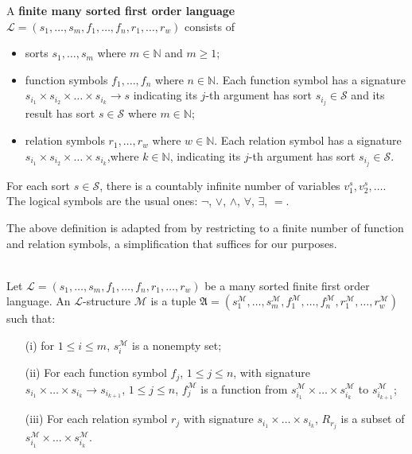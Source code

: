 \begin{definition}
    A \textbf{finite many sorted first order language} 
    \( \mathcal{L} = (s_1,\dots,s_m,f_1,\dots, f_n, r_1, \dots, r_w ) \)
    consists of
    \begin{itemize}
        \item sorts $s_1,\dots,s_m$ where $m \in \mathbb{N}$ and $m \geq 1$;
        \item function symbols $f_1,\dots, f_n$ where $n\in \mathbb{N}$. Each function symbol has a signature $s_{i_1} \times s_{i_2} \times \dots \times s_{i_k} \to s$ indicating its $j$-th argument has sort $s_{i_j} \in \mathcal{S}$ and its result has sort $s \in \mathcal{S}$ where $m \in \mathbb{N}$;
        \item relation symbols $r_1,\dots, r_w$ where $ w\in \mathbb{N}$. Each  relation symbol has a signature $s_{i_1} \times s_{i_2} \times \dots \times s_{i_k}$,where $k \in \mathbb{N}$, indicating its $j$-th argument has sort $s_{i_j} \in \mathcal{S}$.
    \end{itemize}  
    For each sort $s \in \mathcal{S}$, there is a countably infinite number of variables $v_1^s, v_2^s, \dots$. The logical symbols are the usual ones: $\neg$, $\vee$, $\wedge$, $\forall$, $\exists$, $=$.
\end{definition}
The above definition is adapted from \cite[Def.~29.26]{monk2012mathematical} by restricting to a finite number of function and relation symbols, a simplification that suffices for our purposes.

\begin{definition}\ \\
    Let \( \mathcal{L} = (s_1, \dots, s_m, f_1, \dots, f_n, r_1, \dots, r_w) \) be a many sorted finite first order language. An \( \mathcal{L} \)-structure $\mathcal{M}$ is a tuple \( \mathfrak{A} = (s_1^\mathcal{M}, \dots, s_m^\mathcal{M}, f_1^\mathcal{M}, \dots, f_n^\mathcal{M}, r_1^\mathcal{M}, \dots, r_w^\mathcal{M}) \) such that:
    
    \begin{enumerate}
        \item[(i)] for $1 \leq i \leq m$, $s_i^\mathcal{M}$ is a nonempty set;
        
        \item[(ii)] For each function symbol \( f_j \), \( 1 \leq j \leq n \), with signature \( s_{i_1} \times \dots \times s_{i_k} \to s_{i_{k+1}} \), $1 \leq j \leq n$, \( f_j^\mathcal{M} \) is a function from \( s_{i_1}^\mathcal{M} \times \dots \times s_{i_k}^\mathcal{M} \) to \( s_{i_{k+1}}^\mathcal{M} \);
        
        \item[(iii)] For each relation symbol \( r_j \) with signature \( s_{i_1} \times \dots \times s_{i_k} \), \( R_{r_j} \) is a subset of \( s_{i_1}^\mathcal{M} \times \dots \times s_{i_k}^\mathcal{M} \).
    \end{enumerate}
\end{definition}

